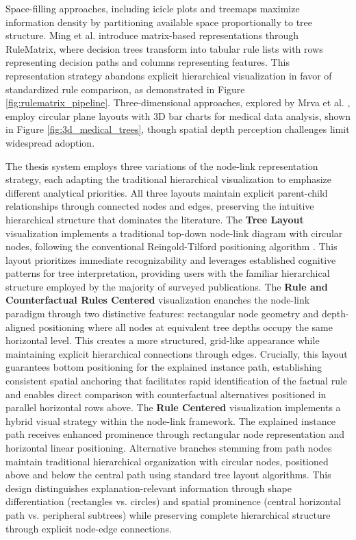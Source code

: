 Space-filling approaches, including icicle plots and treemaps maximize information density by partitioning available space proportionally to tree structure. Ming et al. \cite{ming2019rulematrix} introduce matrix-based representations through RuleMatrix, where decision trees transform into tabular rule lists with rows representing decision paths and columns representing features. This representation strategy abandons explicit hierarchical visualization in favor of standardized rule comparison, as demonstrated in Figure \ref{fig:rulematrix_pipeline}. Three-dimensional approaches, explored by Mrva et al. \cite{mrva2019decision}, employ circular plane layouts with 3D bar charts for medical data analysis, shown in Figure \ref{fig:3d_medical_trees}, though spatial depth perception challenges limit widespread adoption.

The thesis system employs three variations of the node-link representation strategy, each adapting the traditional hierarchical visualization to emphasize different analytical priorities. All three layouts maintain explicit parent-child relationships through connected nodes and edges, preserving the intuitive hierarchical structure that dominates the literature.
The \textbf{Tree Layout} visualization implements a traditional top-down node-link diagram with circular nodes, following the conventional Reingold-Tilford positioning algorithm \cite{1702828}. This layout prioritizes immediate recognizability and leverages established cognitive patterns for tree interpretation, providing users with the familiar hierarchical structure employed by the majority of surveyed publications.
The \textbf{Rule and Counterfactual Rules Centered} visualization enanches the node-link paradigm through two distinctive features: rectangular node geometry and depth-aligned positioning where all nodes at equivalent tree depths occupy the same horizontal level. This creates a more structured, grid-like appearance while maintaining explicit hierarchical connections through edges. Crucially, this layout guarantees bottom positioning for the explained instance path, establishing consistent spatial anchoring that facilitates rapid identification of the factual rule and enables direct comparison with counterfactual alternatives positioned in parallel horizontal rows above.
The \textbf{Rule Centered} visualization implements a hybrid visual strategy within the node-link framework. The explained instance path receives enhanced prominence through rectangular node representation and horizontal linear positioning. Alternative branches stemming from path nodes maintain traditional hierarchical organization with circular nodes, positioned above and below the central path using standard tree layout algorithms. This design distinguishes explanation-relevant information through shape differentiation (rectangles vs. circles) and spatial prominence (central horizontal path vs. peripheral subtrees) while preserving complete hierarchical structure through explicit node-edge connections.

